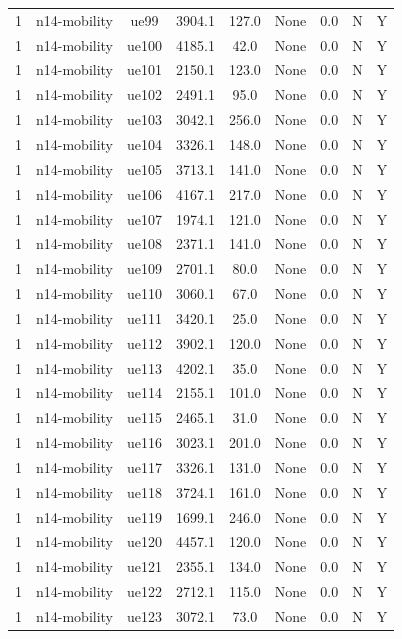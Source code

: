 \begin{table}[ht]
\begin{tabular}{|c|c|c|c|c|c|c|c|c|}
1 & n14-mobility & ue99 & 3904.1 & 127.0 & None & 0.0 & N & Y \\
1 & n14-mobility & ue100 & 4185.1 & 42.0 & None & 0.0 & N & Y \\
1 & n14-mobility & ue101 & 2150.1 & 123.0 & None & 0.0 & N & Y \\
1 & n14-mobility & ue102 & 2491.1 & 95.0 & None & 0.0 & N & Y \\
1 & n14-mobility & ue103 & 3042.1 & 256.0 & None & 0.0 & N & Y \\
1 & n14-mobility & ue104 & 3326.1 & 148.0 & None & 0.0 & N & Y \\
1 & n14-mobility & ue105 & 3713.1 & 141.0 & None & 0.0 & N & Y \\
1 & n14-mobility & ue106 & 4167.1 & 217.0 & None & 0.0 & N & Y \\
1 & n14-mobility & ue107 & 1974.1 & 121.0 & None & 0.0 & N & Y \\
1 & n14-mobility & ue108 & 2371.1 & 141.0 & None & 0.0 & N & Y \\
1 & n14-mobility & ue109 & 2701.1 & 80.0 & None & 0.0 & N & Y \\
1 & n14-mobility & ue110 & 3060.1 & 67.0 & None & 0.0 & N & Y \\
1 & n14-mobility & ue111 & 3420.1 & 25.0 & None & 0.0 & N & Y \\
1 & n14-mobility & ue112 & 3902.1 & 120.0 & None & 0.0 & N & Y \\
1 & n14-mobility & ue113 & 4202.1 & 35.0 & None & 0.0 & N & Y \\
1 & n14-mobility & ue114 & 2155.1 & 101.0 & None & 0.0 & N & Y \\
1 & n14-mobility & ue115 & 2465.1 & 31.0 & None & 0.0 & N & Y \\
1 & n14-mobility & ue116 & 3023.1 & 201.0 & None & 0.0 & N & Y \\
1 & n14-mobility & ue117 & 3326.1 & 131.0 & None & 0.0 & N & Y \\
1 & n14-mobility & ue118 & 3724.1 & 161.0 & None & 0.0 & N & Y \\
1 & n14-mobility & ue119 & 1699.1 & 246.0 & None & 0.0 & N & Y \\
1 & n14-mobility & ue120 & 4457.1 & 120.0 & None & 0.0 & N & Y \\
1 & n14-mobility & ue121 & 2355.1 & 134.0 & None & 0.0 & N & Y \\
1 & n14-mobility & ue122 & 2712.1 & 115.0 & None & 0.0 & N & Y \\
1 & n14-mobility & ue123 & 3072.1 & 73.0 & None & 0.0 & N & Y \\

\end{tabular}
\end{table}

